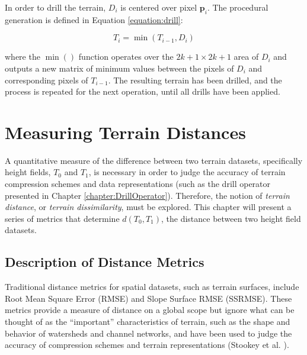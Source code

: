 In order to drill the terrain, $D_{i}$ is centered over pixel $\textbf{p}_{i}$. The procedural generation is defined in Equation \ref{equation:drill}:

\begin{equation}
\label{equation:drill}
  T_{i} = \min\left( T_{i-1}, D_{i} \right)
\end{equation}

\noindent where the $\min\left(\right)$ function operates over the $2k + 1 \times 2k + 1$ area of $D_{i}$ and outputs a new matrix of minimum values between the pixels of $D_{i}$ and corresponding pixels of $T_{i-1}$. The resulting terrain has been drilled, and the process is repeated for the next operation, until all drills have been applied.




\section{Measuring Terrain Distances}
\label{section:TerrainDistances}

A quantitative measure of the difference between two terrain datasets, specifically height fields, $T_{0}$ and $T_{1}$, is necessary 
in order to judge the accuracy of terrain compression schemes and data representations (such as the drill operator presented in Chapter \ref{chapter:DrillOperator}).
Therefore, the notion of \textit{terrain distance}, or \textit{terrain dissimilarity}, must be explored. This chapter will present a series of metrics that determine $d\left(T_{0}, T_{1}\right)$, the distance between two height field datasets.

\subsection{Description of Distance Metrics}
\label{section:DescriptionOfMetrics}

Traditional distance metrics for spatial datasets, such as terrain surfaces, include Root Mean Square Error (RMSE) and Slope Surface RMSE (SSRMSE). These metrics provide a measure of 
distance on a global scope but ignore what can be thought of as the ``important'' characteristics of terrain, such as the shape and behavior of watersheds and channel networks,
and have been used to judge the accuracy of compression schemes and terrain representations (Stookey et al. \cite{Stookey08parallelodetlap}).


